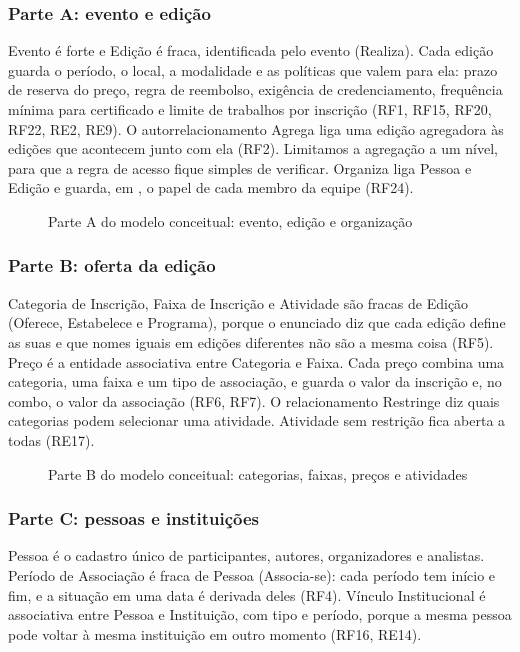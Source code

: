\subsubsection*{Parte A: evento e edição}

Evento é forte e Edição é fraca, identificada pelo evento (Realiza). Cada edição guarda o período, o local, a modalidade e as políticas que valem para ela: prazo de reserva do preço, regra de reembolso, exigência de credenciamento, frequência mínima para certificado e limite de trabalhos por inscrição (RF1, RF15, RF20, RF22, RE2, RE9). O autorrelacionamento Agrega liga uma edição agregadora às edições que acontecem junto com ela (RF2). Limitamos a agregação a um nível, para que a regra de acesso fique simples de verificar. Organiza liga Pessoa e Edição e guarda, em , o papel de cada membro da equipe (RF24).

\begin{figure}[h!]
\centering
\merA
\caption{Parte A do modelo conceitual: evento, edição e organização}
\label{fig:merA}
\end{figure}

\subsubsection*{Parte B: oferta da edição}

Categoria de Inscrição, Faixa de Inscrição e Atividade são fracas de Edição (Oferece, Estabelece e Programa), porque o enunciado diz que cada edição define as suas e que nomes iguais em edições diferentes não são a mesma coisa (RF5). Preço é a entidade associativa entre Categoria e Faixa. Cada preço combina uma categoria, uma faixa e um tipo de associação, e guarda o valor da inscrição e, no combo, o valor da associação (RF6, RF7). O relacionamento Restringe diz quais categorias podem selecionar uma atividade. Atividade sem restrição fica aberta a todas (RE17).

\begin{figure}[h!]
\centering
\merB
\caption{Parte B do modelo conceitual: categorias, faixas, preços e atividades}
\label{fig:merB}
\end{figure}

\subsubsection*{Parte C: pessoas e instituições}

Pessoa é o cadastro único de participantes, autores, organizadores e analistas. Período de Associação é fraca de Pessoa (Associa-se): cada período tem início e fim, e a situação em uma data é derivada deles (RF4). Vínculo Institucional é associativa entre Pessoa e Instituição, com tipo e período, porque a mesma pessoa pode voltar à mesma instituição em outro momento (RF16, RE14).

